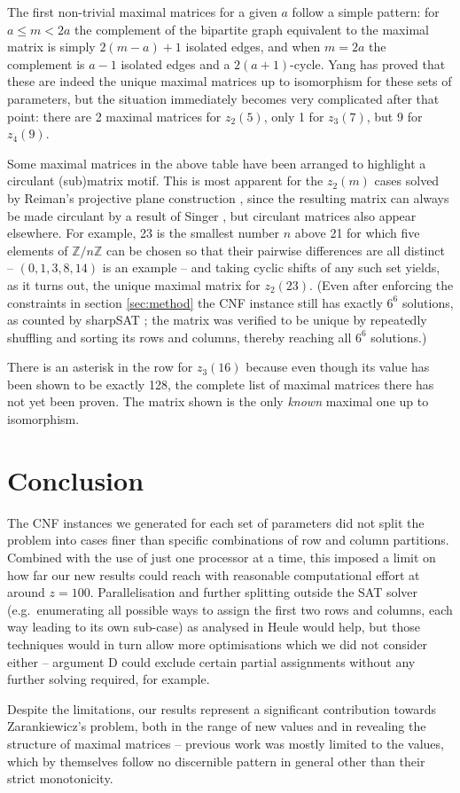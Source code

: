 \documentclass[10pt,a4paper]{article}
\theoremstyle{definition}
\begin{document}
	The first non-trivial maximal matrices for a given $a$ follow a simple pattern: for $a\le m<2a$ the complement of the bipartite graph equivalent to the maximal matrix is simply $2(m-a)+1$ isolated edges, and when $m=2a$ the complement is $a-1$ isolated edges and a $2(a+1)$-cycle. Yang \cite{yang} has proved that these are indeed the unique maximal matrices up to isomorphism for these sets of parameters, but the situation immediately becomes very complicated after that point: there are 2 maximal matrices for $z_2(5)$, only 1 for $z_3(7)$, but 9 for $z_4(9)$.
	
	Some maximal matrices in the above table have been arranged to highlight a circulant (sub)matrix motif. This is most apparent for the $z_2(m)$ cases solved by Reiman's projective plane construction \cite{reiman}, since the resulting matrix can always be made circulant by a result of Singer \cite{singer}, but circulant matrices also appear elsewhere. For example, 23 is the smallest number $n$ above 21 for which five elements of $\mathbb Z/n\mathbb Z$ can be chosen so that their pairwise differences are all distinct -- $(0,1,3,8,14)$ is an example -- and taking cyclic shifts of any such set yields, as it turns out, the unique maximal matrix for $z_2(23)$. (Even after enforcing the constraints in section \ref{sec:method} the CNF instance still has exactly $6^6$ solutions, as counted by sharpSAT \cite{sharpSAT}; the matrix was verified to be unique by repeatedly shuffling and sorting its rows and columns, thereby reaching all $6^6$ solutions.)
	
	There is an asterisk in the row for $z_3(16)$ because even though its value has been shown to be exactly 128, the complete list of maximal matrices there has not yet been proven. The matrix shown is the only \textit{known} maximal one up to isomorphism.
	
	\section{Conclusion}
	
	The CNF instances we generated for each set of parameters did not split the problem into cases finer than specific combinations of row and column partitions. Combined with the use of just one processor at a time, this imposed a limit on how far our new results could reach with reasonable computational effort at around $z=100$. Parallelisation and further splitting outside the SAT solver (e.g.\ enumerating all possible ways to assign the first two rows and columns, each way leading to its own sub-case) as analysed in Heule \cite{schur5} would help, but those techniques would in turn allow more optimisations which we did not consider either -- argument D could exclude certain partial assignments without any further solving required, for example.
	
	Despite the limitations, our results represent a significant contribution towards Zarankiewicz's problem, both in the range of new values and in revealing the structure of maximal matrices -- previous work was mostly limited to the values, which by themselves follow no discernible pattern in general other than their strict monotonicity.
	
	\begingroup
	\sloppy
	\printbibliography
	\endgroup
\end{document}

